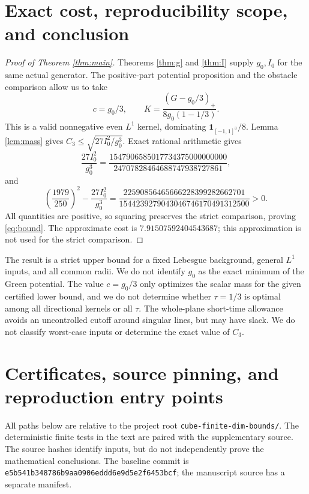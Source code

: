 \documentclass[11pt,a4paper]{article}
\theoremstyle{definition}\newtheorem{definition}[theorem]{Definition}
\theoremstyle{remark}\newtheorem{remark}[theorem]{Remark}
\newcommand{\one}{\mathbf 1}
\newcommand{\src}[1]{\nolinkurl{#1}}
\begin{document}
\section{Exact cost, reproducibility scope, and conclusion}
\begin{proof}[Proof of Theorem \ref{thm:main}]
Theorems \ref{thm:g} and \ref{thm:I} supply $g_0,I_0$ for the same actual generator. The positive-part potential proposition and the obstacle comparison allow us to take
\[
 c=g_0/3,\qquad K=\frac{(G-g_0/3)_+}{8g_0(1-1/3)}.
\]
This is a valid nonnegative even $L^1$ kernel, dominating $\one_{[-1,1]^3}/8$. Lemma \ref{lem:mass} gives $C_3\le\sqrt{27I_0^2/g_0^3}$. Exact rational arithmetic gives
\[
 \frac{27I_0^2}{g_0^3}=
 \frac{1547906585017734375000000000}{24707828464688747938727861},
\]
and
\begin{equation}\label{eq:slack}
 \left(\frac{1979}{250}\right)^2-\frac{27I_0^2}{g_0^3}
 =\frac{22590856465666228399282662701}
 {1544239279043046746170491312500}>0.
\end{equation}
All quantities are positive, so squaring preserves the strict comparison, proving \eqref{eq:bound}. The approximate cost is $7.91507592404543687$; this approximation is not used for the strict comparison.
\end{proof}

The result is a strict upper bound for a fixed Lebesgue background, general $L^1$ inputs, and all common radii. We do not identify $g_0$ as the exact minimum of the Green potential. The value $c=g_0/3$ only optimizes the scalar mass for the given certified lower bound, and we do not determine whether $\tau=1/3$ is optimal among all directional kernels or all $\tau$. The whole-plane short-time allowance avoids an uncontrolled cutoff around singular lines, but may have slack. We do not classify worst-case inputs or determine the exact value of $C_3$.

\appendix
\section{Certificates, source pinning, and reproduction entry points}\label{app:reproduce}
All paths below are relative to the project root \src{cube-finite-dim-bounds/}. The deterministic finite tests in the text are paired with the supplementary source. The source hashes identify inputs, but do not independently prove the mathematical conclusions. The baseline commit is \texttt{e5b541b348786b9aa0906}\allowbreak\texttt{eddd6e9d5e2f6453bcf}; the manuscript source has a separate manifest.
\end{document}
